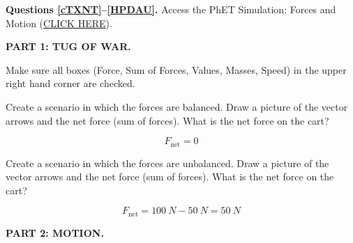 \documentclass[../main-physics-problems.tex]{subfiles}
\begin{document}
\begin{questions}
\begin{EnvUplevel}
    \textbf{Questions \ref{cTXNT}--\ref{HPDAU}.} Access the PhET Simulation: Forces and Motion (\href{https://phet.colorado.edu/sims/html/forces-and-motion-basics/latest/forces-and-motion-basics_all.html}{CLICK HERE}).

    \textbf{PART 1: TUG OF WAR.} 
    
    Make sure all boxes (Force, Sum of Forces, Values, Masses, Speed) in the upper right hand corner are checked.
\end{EnvUplevel}

\question \label{cTXNT}
Create a scenario in which the forces are balanced. Draw a picture of the vector arrows and the net force (sum of forces). What is the net force on the cart? 

\begin{solution}
\begin{center}

\begin{equation*}
    F_\mathrm{net} = 0
\end{equation*}
\end{center}
\end{solution}

\question
Create a scenario in which the forces are unbalanced. Draw a picture of the vector arrows and the net force (sum of forces). What is the net force on the cart?

\begin{solution}
\begin{center}

\begin{equation*}
    F_\mathrm{net} = \SI{100}{N} - \SI{50}{N} = \SI{50}{N}
\end{equation*}

\end{center}
\end{solution}


\begin{EnvUplevel}
    \textbf{PART 2: MOTION.} 
    

\end{EnvUplevel}
\end{questions}
\end{document}
